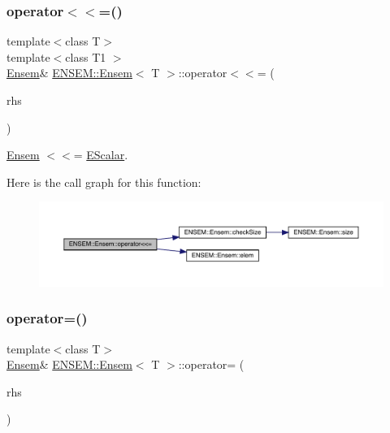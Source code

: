\subsubsection{\texorpdfstring{operator$<$$<$=()}{operator<<=()}\hspace{0.1cm}{\footnotesize\ttfamily [3/3]}}
{\footnotesize\ttfamily template$<$class T$>$ \\
template$<$class T1 $>$ \\
\mbox{\hyperlink{classENSEM_1_1Ensem}{Ensem}}\& \mbox{\hyperlink{classENSEM_1_1Ensem}{E\+N\+S\+E\+M\+::\+Ensem}}$<$ T $>$\+::operator$<$$<$= (\begin{DoxyParamCaption}\item[{const \mbox{\hyperlink{classENSEM_1_1EScalar}{E\+Scalar}}$<$ T1 $>$ \&}]{rhs }\end{DoxyParamCaption})\hspace{0.3cm}{\ttfamily [inline]}}



\mbox{\hyperlink{classENSEM_1_1Ensem}{Ensem}} $<$$<$= \mbox{\hyperlink{classENSEM_1_1EScalar}{E\+Scalar}}. 

Here is the call graph for this function\+:
\nopagebreak
\begin{figure}[H]
\begin{center}
\leavevmode
\includegraphics[width=350pt]{d7/d3e/classENSEM_1_1Ensem_a9aecabccdc31d9b43db877a82879f702_cgraph}
\end{center}
\end{figure}
\mbox{\label{classENSEM_1_1Ensem_a1331b77ba6b10ddefa983e39976b4db6}} 
\subsubsection{\texorpdfstring{operator=()}{operator=()}\hspace{0.1cm}{\footnotesize\ttfamily [1/15]}}
{\footnotesize\ttfamily template$<$class T$>$ \\
\mbox{\hyperlink{classENSEM_1_1Ensem}{Ensem}}\& \mbox{\hyperlink{classENSEM_1_1Ensem}{E\+N\+S\+E\+M\+::\+Ensem}}$<$ T $>$\+::operator= (\begin{DoxyParamCaption}\item[{const typename \mbox{\hyperlink{structENSEM_1_1WordType}{Word\+Type}}$<$ T $>$\+::Type\+\_\+t \&}]{rhs }\end{DoxyParamCaption})\hspace{0.3cm}{\ttfamily [inline]}}



